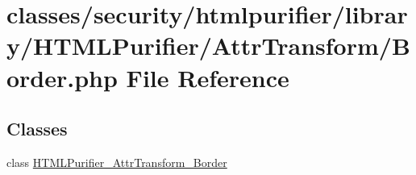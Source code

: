 \hypertarget{AttrTransform_2Border_8php}{\section{classes/security/htmlpurifier/library/\+H\+T\+M\+L\+Purifier/\+Attr\+Transform/\+Border.php File Reference}
\label{AttrTransform_2Border_8php}
}
\subsection*{Classes}
\begin{DoxyCompactItemize}
\item 
class \hyperlink{classHTMLPurifier__AttrTransform__Border}{H\+T\+M\+L\+Purifier\+\_\+\+Attr\+Transform\+\_\+\+Border}
\end{DoxyCompactItemize}
